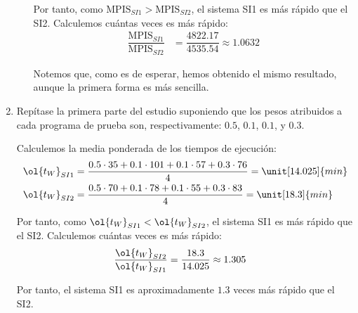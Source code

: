 \begin{ejercicio}
\begin{enumerate}
\begin{enumerate}
        Por tanto, como $\text{MPIS}_{SI1} > \text{MPIS}_{SI2}$, el sistema SI1 es más rápido que el SI2. Calculemos cuántas veces es más rápido:
        \begin{align*}
            \dfrac{\text{MPIS}_{SI1}}{\text{MPIS}_{SI2}} &= \dfrac{4822.17}{4535.54} \approx 1.0632
        \end{align*}

        Notemos que, como es de esperar, hemos obtenido el mismo resultado, aunque la primera forma es más sencilla.

    \end{enumerate}
    \item Repítase la primera parte del estudio suponiendo que los pesos atribuidos a cada programa de prueba son, respectivamente: $0.5$, $0.1$, $0.1$, y $0.3$.
    
    Calculemos la media ponderada de los tiempos de ejecución: 
    \begin{align*}
        \ol{t_W}_{SI1} &= \dfrac{0.5\cdot 35 + 0.1\cdot 101 + 0.1\cdot 57 + 0.3\cdot 76}{4}= \unit[14.025]{min}\\
        \ol{t_W}_{SI2} &= \dfrac{0.5\cdot 70 + 0.1\cdot 78 + 0.1\cdot 55 + 0.3\cdot 83}{4} = \unit[18.3]{min}
    \end{align*}

    Por tanto, como $\ol{t_W}_{SI1} < \ol{t_W}_{SI2}$, el sistema SI1 es más rápido que el SI2. Calculemos cuántas veces es más rápido:
    \begin{align*}
        \dfrac{\ol{t_W}_{SI2}}{\ol{t_W}_{SI1}} &= \dfrac{18.3}{14.025} \approx 1.305
    \end{align*}

    Por tanto, el sistema SI1 es aproximadamente $1.3$ veces más rápido que el SI2.
\end{enumerate}
\end{ejercicio}
\begin{comment}Sol:
1. El sistema SI1 es 1,06 veces más rápido que SI2 atendiendo al tiempo de ejecución. Los MIPS obtenidos por ambos sistemas son, respectivamente, 4822,2 y 4535,5.
2. En este nuevo escenario, el sistema SI1 es 1,3 veces más rápido que SI2 atendiendo al tiempo de ejecución.
\end{comment}

